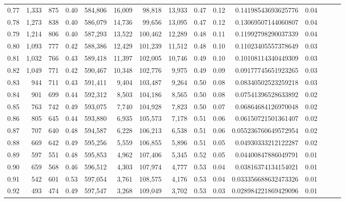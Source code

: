 \begin{tabular}{rrrrrrrrrrrrrrr}
0.77 &   1,333 &    875 &  0.40 &  584,806 &   16,009 &   98,818 &   13,933 &  0.47 &  0.12 &   0.14198543693625776 &      0.04 \\
0.78 &   1,273 &    838 &  0.40 &  586,079 &   14,736 &   99,656 &   13,095 &  0.47 &  0.12 &   0.13069507144060807 &      0.04 \\
0.79 &   1,214 &    806 &  0.40 &  587,293 &   13,522 &  100,462 &   12,289 &  0.48 &  0.11 &   0.11992798290037339 &      0.04 \\
0.80 &   1,093 &    777 &  0.42 &  588,386 &   12,429 &  101,239 &   11,512 &  0.48 &  0.10 &   0.11023405557378649 &      0.03 \\
0.81 &   1,032 &    766 &  0.43 &  589,418 &   11,397 &  102,005 &   10,746 &  0.49 &  0.10 &   0.10108114340449309 &      0.03 \\
0.82 &   1,049 &    771 &  0.42 &  590,467 &   10,348 &  102,776 &    9,975 &  0.49 &  0.09 &   0.09177745651923265 &      0.03 \\
0.83 &     944 &    711 &  0.43 &  591,411 &    9,404 &  103,487 &    9,264 &  0.50 &  0.08 &   0.08340502523259218 &      0.03 \\
0.84 &     901 &    699 &  0.44 &  592,312 &    8,503 &  104,186 &    8,565 &  0.50 &  0.08 &   0.07541396528633892 &      0.02 \\
0.85 &     763 &    742 &  0.49 &  593,075 &    7,740 &  104,928 &    7,823 &  0.50 &  0.07 &   0.06864684126970048 &      0.02 \\
0.86 &     805 &    645 &  0.44 &  593,880 &    6,935 &  105,573 &    7,178 &  0.51 &  0.06 &   0.06150721501361407 &      0.02 \\
0.87 &     707 &    640 &  0.48 &  594,587 &    6,228 &  106,213 &    6,538 &  0.51 &  0.06 &  0.055236760649572954 &      0.02 \\
0.88 &     669 &    642 &  0.49 &  595,256 &    5,559 &  106,855 &    5,896 &  0.51 &  0.05 &   0.04930333212122287 &      0.02 \\
0.89 &     597 &    551 &  0.48 &  595,853 &    4,962 &  107,406 &    5,345 &  0.52 &  0.05 &   0.04400847886049791 &      0.01 \\
0.90 &     659 &    568 &  0.46 &  596,512 &    4,303 &  107,974 &    4,777 &  0.53 &  0.04 &   0.03816374134154021 &      0.01 \\
0.91 &     542 &    601 &  0.53 &  597,054 &    3,761 &  108,575 &    4,176 &  0.53 &  0.04 &  0.033356688632473326 &      0.01 \\
0.92 &     493 &    474 &  0.49 &  597,547 &    3,268 &  109,049 &    3,702 &  0.53 &  0.03 &  0.028984221869429096 &      0.01 \\

\end{tabular}
